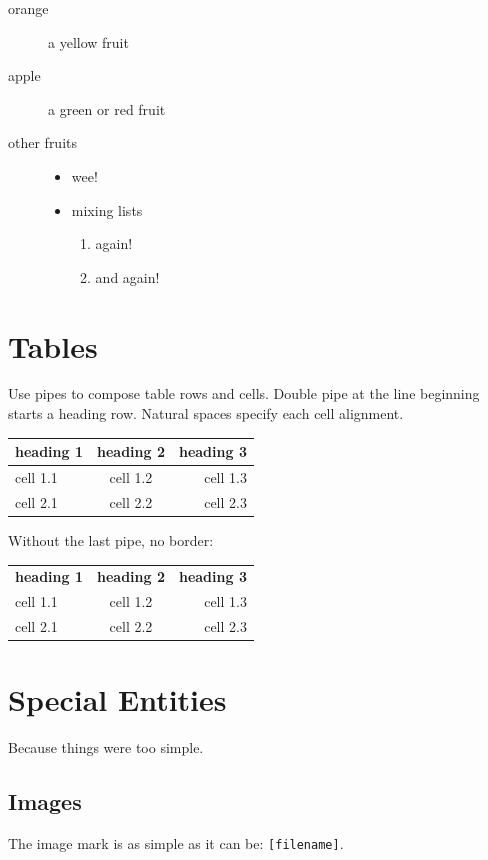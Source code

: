 \documentclass{article}
\begin{document}
\begin{description}
\item[orange]
  a yellow fruit
\item[apple]
  a green or red fruit
\item[other fruits]
  \begin{itemize}
  \item wee!
  \item mixing lists
    \begin{enumerate}
    \item again!
    \item and again!
    \end{enumerate}
  \end{itemize}
\end{description}


\section*{Tables}
Use pipes to compose table rows and cells.
Double pipe at the line beginning starts a heading row.
Natural spaces specify each cell alignment.

\begin{center}\begin{tabular}{|l|c|r|}
\hline \textbf{heading 1} & \textbf{heading 2} & \textbf{heading 3} \\
\hline cell 1.1 & cell 1.2 & cell 1.3 \\
\hline cell 2.1 & cell 2.2 & cell 2.3 \\
\hline \end{tabular}\end{center}

Without the last pipe, no border:

\begin{center}\begin{tabular}{lcr}
\textbf{heading 1} & \textbf{heading 2} & \textbf{heading 3} \\
cell 1.1 & cell 1.2 & cell 1.3 \\
cell 2.1 & cell 2.2 & cell 2.3 \\
\end{tabular}\end{center}


\section*{Special Entities}
Because things were too simple.

\subsection*{Images}
The image mark is as simple as it can be: \texttt{[filename]}.
\end{document}
